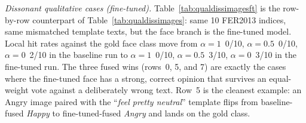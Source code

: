 \documentclass[sigconf,nonacm]{acmart}
\begin{document}
  \emph{Dissonant qualitative cases (fine-tuned).} Table~\ref{tab:qualdissimagesft} is the row-by-row counterpart of Table~\ref{tab:qualdissimages}: same 10 FER2013 indices, same mismatched template texts, but the face branch is the fine-tuned model. Local hit rates against the gold face class move from $\alpha\!=\!1$~0/10, $\alpha\!=\!0.5$~0/10, $\alpha\!=\!0$~2/10 in the baseline run to $\alpha\!=\!1$~0/10, $\alpha\!=\!0.5$~3/10, $\alpha\!=\!0$~3/10 in the fine-tuned run. The three fused wins (rows~0, 5, and 7) are exactly the cases where the fine-tuned face has a strong, correct opinion that survives an equal-weight vote against a deliberately wrong text. Row~5 is the cleanest example: an Angry image paired with the ``\emph{feel pretty neutral}'' template flips from baseline-fused \emph{Happy} to fine-tuned-fused \emph{Angry} and lands on the gold class.
\end{document}
